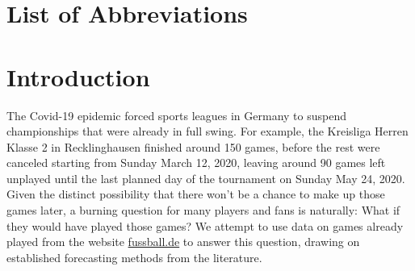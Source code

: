 \documentclass[12pt,a4paper]{article}
\begin{document}
\newpage
\listoffigures
{}

\listoftables
{}

\section*{List of Abbreviations}

\begin{adjustwidth}{1.5em}{0pt}

\begin{acronym}[dummyyyy]


\end{acronym}

\end{adjustwidth}

\restoregeometry

\newpage
{}
\hypertarget{introduction}{%
\section{Introduction}\label{introduction}}

The Covid-19 epidemic forced sports leagues in Germany to suspend
championships that were already in full swing. For example, the
Kreisliga Herren Klasse 2 in Recklinghausen finished around 150 games,
before the rest were canceled starting from Sunday March 12, 2020,
leaving around 90 games left unplayed until the last planned day of the
tournament on Sunday May 24, 2020. Given the distinct possibility that
there won't be a chance to make up those games later, a burning question
for many players and fans is naturally: What if they would have played
those games? We attempt to use data on games already played from the
website
\href{http://www.fussball.de/spielplan/re-kl-a-2-kreis-recklinghausen-kreisliga-a-herren-saison1920-westfalen/-/staffel/027II28DS800000DVS5489B3VS3GHJJU-G\#!/section/matchplan}{fussball.de}
to answer this question, drawing on established forecasting methods from
the literature.
\end{document}
